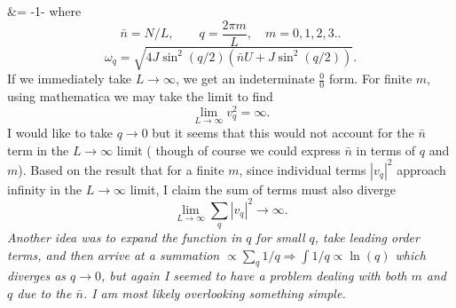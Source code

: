 \documentclass[10pt,letterpaper]{article}
\begin{document}
	&= -1-
\ea
where
\[
	\bar n = N/L,\qquad q = \frac{2\pi m}{L},\quad m = 0,1,2,3..
\]
\[
	\omega_q = \sqrt{ 4J\sin^2(q/2)(\bar n U+J\sin^2(q/2))}.
\]
If we immediately take $L\to \infty$, we get an indeterminate $\frac{0}{0}$ form. For finite $m$, using mathematica
we may take the limit to find
\[
	\lim_{L\to\infty} v_q^2 = \infty.
\]
I would like to take $q\to 0$ but it seems that this would not account for the $\bar n$ term in the $L\to \infty$ limit ( though of course we could express $\bar n$ in terms of $q$ and $m$). Based on the result that for a finite $m$, since individual terms 
$|v_q|^2$ approach infinity in the $L\to\infty$ limit, I claim the sum of terms must also diverge
\[
	\lim_{L\to\infty} \sum_q |v_q|^2 \to \infty.
\]
\emph{Another idea was to expand the function in $q$ for small $q$, take leading order terms, and then
arrive at a summation $\propto \sum_q 1/q \Rightarrow \int 1/q \propto \ln(q)$ which diverges as $q\to 0$, but
again I seemed to have a problem dealing with both $m$ and $q$ due to the $\bar n$. I am most likely overlooking something simple.}
\eenum
\end{document}

